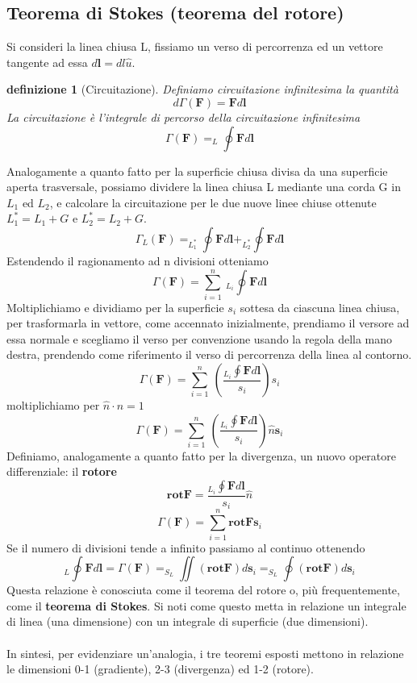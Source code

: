 \documentclass[10pt,a4paper]{article}
\newtheorem{definizione}{definizione}
\begin{document}
\subsection{Teorema di Stokes (teorema del rotore)}
Si consideri la linea chiusa L, fissiamo un verso di percorrenza ed un vettore tangente ad essa $d\mathbf{l}= dl\hat{u}$. 
\begin{definizione}[Circuitazione]
	Definiamo circuitazione infinitesima la quantità
	\[d\Gamma(\mathbf{F}) = \mathbf{F}d\mathbf{l}\]
	La circuitazione è l'integrale di percorso della circuitazione infinitesima
	\[\Gamma(\mathbf{F}) = _L\oint \mathbf{F}d\mathbf{l}\]
\end{definizione}
Analogamente a quanto fatto per la superficie chiusa divisa da una superficie aperta trasversale, possiamo dividere la linea chiusa L mediante una corda G in \(L_1\) ed \(L_2\), e calcolare la circuitazione per le due nuove linee chiuse ottenute \(L_1^* = L_1+G\) e \(L_2^* = L_2+G\).
\[\Gamma_L(\mathbf{F}) = _{L_1^*}\oint \mathbf{F}d\mathbf{l}+_{L_2^*}\oint \mathbf{F}d\mathbf{l} \]
Estendendo il ragionamento ad n divisioni otteniamo
\[\Gamma(\mathbf{F}) = \sum_{i=1}^{n}\ _{L_i}\oint\mathbf{F}d\mathbf{l}\]
Moltiplichiamo e dividiamo per la superficie \(s_i\) sottesa da ciascuna linea chiusa, per trasformarla in vettore, come accennato inizialmente, prendiamo il versore ad essa normale e scegliamo il verso per convenzione usando la regola della mano destra, prendendo come riferimento il verso di percorrenza della linea al contorno.
\[\Gamma(\mathbf{F}) = \sum_{i=1}^{n}\ \left( \frac{_{L_i}\oint\mathbf{F}d\mathbf{l}}{s_i}\right)s_i\]
moltiplichiamo per \(\hat{n}\cdot\hat{n}=1\)
\[\Gamma(\mathbf{F}) = \sum_{i=1}^{n}\ \left( \frac{_{L_i}\oint\mathbf{F}d\mathbf{l}}{s_i}\right)\hat{n}\mathbf{s}_i\]
Definiamo, analogamente a quanto fatto per la divergenza, un nuovo operatore differenziale: il \textbf{rotore}
\[\mathbf{rot}\mathbf{F} = \frac{_{L_i}\oint\mathbf{F}d\mathbf{l}}{s_i}\hat{n}\]
\[\Gamma(\mathbf{F}) = \sum_{i=1}^{n}\mathbf{rot}\mathbf{F}\mathbf{s}_i \]
Se il numero di divisioni tende a infinito passiamo al continuo ottenendo
\[_L\oint\mathbf{F}d\mathbf{l} =\Gamma(\mathbf{F}) = _{S_L}\iint(\mathbf{rot}\mathbf{F})d\mathbf{s}_i =_{S_L}\oint(\mathbf{rot}\mathbf{F})d\mathbf{s}_i\]
Questa relazione è conosciuta come il teorema del rotore o, più frequentemente, come il \textbf{teorema di Stokes}. Si noti come questo metta in relazione un integrale di linea (una dimensione) con un integrale di superficie (due dimensioni).\\\\
In sintesi, per evidenziare un'analogia, i tre teoremi esposti mettono in relazione le dimensioni 0-1 (gradiente), 2-3 (divergenza) ed 1-2 (rotore).
\end{document}
